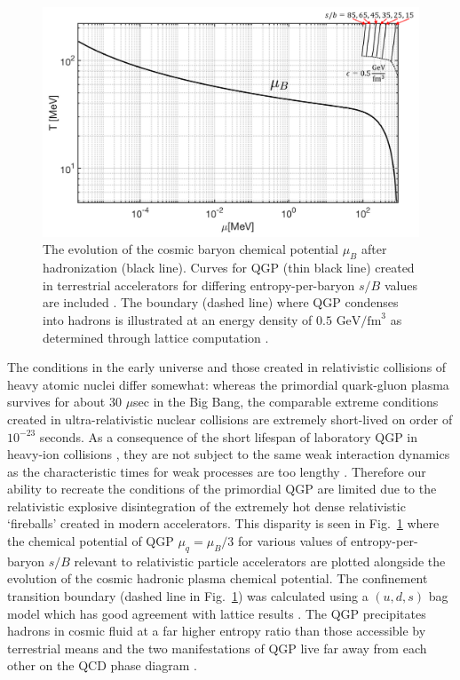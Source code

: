 \documentclass[universe,article,submit,moreauthors,pdftex,a4paper]{Definitions/mdpi}
\newcommand{\GeV}{\text{ GeV}}
\newcommand*{\rf}[1]{Fig.~{\ref{#1}}}
\begin{document}
\begin{figure}[ht]
  \centering
  \includegraphics[width=\textwidth]{./plots/phaseQGP}
  \caption{The evolution of the cosmic baryon chemical potential $\mu_{B}$ after hadronization (black line). Curves for QGP (thin black line) created in terrestrial accelerators for differing entropy-per-baryon $s/B$ values are included \cite{Rafelski:1987nv}. The boundary (dashed line) where QGP condenses into hadrons is illustrated at an energy density of $0.5\GeV/\mathrm{fm}^{3}$ as determined through lattice computation \cite{HotQCD:2014kol}.}
  \label{phaseQGP} 
\end{figure}


The conditions in the early universe and those created in relativistic collisions of heavy atomic nuclei differ somewhat: whereas the primordial quark-gluon plasma survives for about 30 $\mu$sec in the Big Bang, the comparable extreme conditions created in ultra-relativistic nuclear collisions are extremely short-lived \cite{Rafelski:2001hp} on order of $10^{-23}$ seconds. As a consequence of the short lifespan of laboratory QGP in heavy-ion collisions \cite{Ollitrault:1992bk,Petran:2013lja}, they are not subject to the same weak interaction dynamics \cite{Ryu:2015vwa} as the characteristic times for weak processes are too lengthy \cite{Rafelski:1982ii}. Therefore our ability to recreate the conditions of the primordial QGP are limited due to the relativistic explosive disintegration of the extremely hot dense relativistic `fireballs' created in modern accelerators. This disparity is seen in \rf{phaseQGP} where the chemical potential of QGP $\mu_{q}=\mu_{B}/3$ \cite{Rafelski:1987nv} for various values of entropy-per-baryon $s/B$ relevant to relativistic particle accelerators are plotted alongside the evolution of the cosmic hadronic plasma chemical potential. The confinement transition boundary (dashed line in \rf{phaseQGP}) was calculated using a $(u,d,s)$ bag model \cite{Letessier:2002ony} which has good agreement with lattice results \cite{HotQCD:2014kol}. The QGP precipitates hadrons in cosmic fluid at a far higher entropy ratio than those accessible by terrestrial means and the two manifestations of QGP live far away from each other on the QCD phase diagram \cite{Braun-Munzinger:2008szb,Bazavov:2009zn,Jacak:2012dx}.
\end{document}
